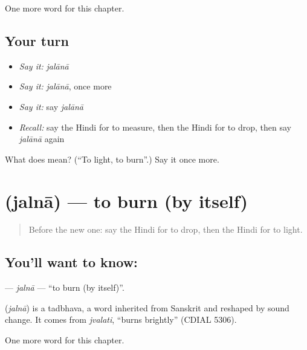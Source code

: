 \begin{grammarlens}[title={What you've built}]
One more word for this chapter.
\end{grammarlens}

\subsection*{Your turn}
\begin{itemize}
\raggedright
  \item \emph{Say it:} \emph{jalānā}
  \item \emph{Say it:} \emph{jalānā}, once more
  \item \emph{Say it:} say \emph{jalānā}
  \item \emph{Recall:} say the Hindi for to measure, then the Hindi for to drop, then say \emph{jalānā} again
\end{itemize}

\begin{tcolorbox}[breakable,colback=teal!4,colframe=teal!35!black,title={Before you move on}]
What does  mean? (\textquotedblleft{}To light, to burn\textquotedblright{}.) Say it once more.
\end{tcolorbox}
\section[\texorpdfstring{\hi{जलना} (jalnā)}{जलना (jalnā)}]{ (jalnā) — to burn (by itself)}

\label{lesson:HI-C175-jalna}



\begin{quote}
Before the new one: say the Hindi for to drop, then the Hindi for to light.
\end{quote}

\subsection*{You'll want to know: }
\textbf{} — \emph{jalnā} — \textquotedblleft{}to burn (by itself)\textquotedblright{}.

\begin{cousinweb}
\textbf{} (\emph{jalnā}) is a tadbhava, a word inherited from Sanskrit and reshaped by sound change. It comes from \emph{jvalati}, \textquotedblleft{}burns brightly\textquotedblright{} (CDIAL 5306).
\end{cousinweb}

\begin{grammarlens}[title={What you've built}]
One more word for this chapter.
\end{grammarlens}

